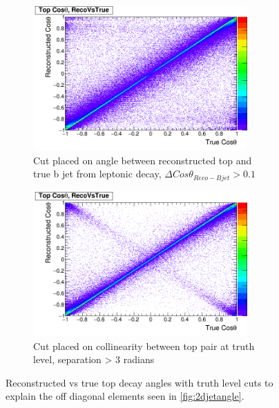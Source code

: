 \begin{figure}
  \centering
  \begin{subfigure}{.5\textwidth}
    \centering
    \includegraphics[width=0.9\textwidth]{TopAnalysis/figures/CosThetaRecoVsMC_NotNextToLepTop.png}
    \caption[Cut placed on angle between reconstructed top and true b jet from leptonic decay]{Cut placed on angle between reconstructed top and true b jet from leptonic decay, $\Delta Cos\theta_{Reco-Bjet}>0.1$}
    \label{fig:2djetangle_farfromleptop}
  \end{subfigure}%
  \begin{subfigure}{.5\textwidth}
    \centering
    \includegraphics[width=0.9\textwidth]{TopAnalysis/figures/CosThetaRecoVsMC_MCTopsWellSeparated.png}
    \caption[Cut placed on collinearity between top pair at truth level]{Cut placed on collinearity between top pair at truth level, separation > 3 radians}
    \label{fig:2djetangle_goodtopseparation}
  \end{subfigure}
  \caption[Reconstructed vs true top decay angles with truth level cuts]{Reconstructed vs true top decay angles with truth level cuts to explain the off diagonal elements seen in \ref{fig:2djetangle}.}
  \label{fig:2djetangle_explanations}
\end{figure}




